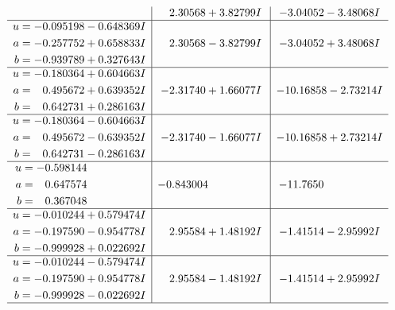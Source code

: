 \documentclass[1p]{elsarticle_modified}
\theoremstyle{definition}
\begin{document}
$$\begin{array}{c|c|c}
 & \phantom{-}2.30568 + 3.82799 I & -3.04052 - 3.48068 I \\ \hline\begin{aligned}
u &= -0.095198 - 0.648369 I \\
a &= -0.257752 + 0.658833 I \\
b &= -0.939789 + 0.327643 I\end{aligned}
 & \phantom{-}2.30568 - 3.82799 I & -3.04052 + 3.48068 I \\ \hline\begin{aligned}
u &= -0.180364 + 0.604663 I \\
a &= \phantom{-}0.495672 + 0.639352 I \\
b &= \phantom{-}0.642731 + 0.286163 I\end{aligned}
 & -2.31740 + 1.66077 I & -10.16858 - 2.73214 I \\ \hline\begin{aligned}
u &= -0.180364 - 0.604663 I \\
a &= \phantom{-}0.495672 - 0.639352 I \\
b &= \phantom{-}0.642731 - 0.286163 I\end{aligned}
 & -2.31740 - 1.66077 I & -10.16858 + 2.73214 I \\ \hline\begin{aligned}
u &= -0.598144\phantom{ +0.000000I} \\
a &= \phantom{-}0.647574\phantom{ +0.000000I} \\
b &= \phantom{-}0.367048\phantom{ +0.000000I}\end{aligned}
 & -0.843004\phantom{ +0.000000I} & -11.7650\phantom{ +0.000000I} \\ \hline\begin{aligned}
u &= -0.010244 + 0.579474 I \\
a &= -0.197590 - 0.954778 I \\
b &= -0.999928 + 0.022692 I\end{aligned}
 & \phantom{-}2.95584 + 1.48192 I & -1.41514 - 2.95992 I \\ \hline\begin{aligned}
u &= -0.010244 - 0.579474 I \\
a &= -0.197590 + 0.954778 I \\
b &= -0.999928 - 0.022692 I\end{aligned}
 & \phantom{-}2.95584 - 1.48192 I & -1.41514 + 2.95992 I\\
 \hline 
 \end{array}$$\newpage$$\begin{array}{c|c|c}  

\end{array}$$
\end{document}
